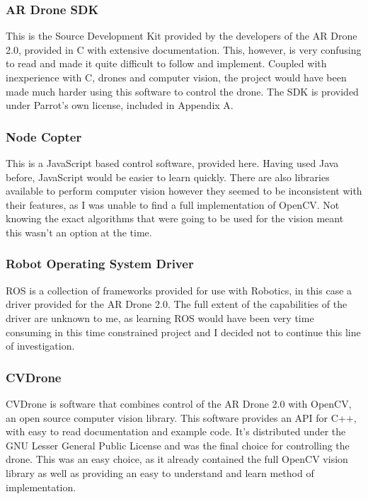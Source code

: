 \subsubsection{AR Drone SDK}
This is the Source Development Kit provided by the developers of the AR Drone 2.0\cite{DroneAPI}, provided in C with extensive documentation\cite{DroneDevGuide}. This, however, is very confusing to read and made it quite difficult to follow and implement. Coupled with inexperience with C, drones and computer vision, the project would have been made much harder using this software to control the drone. The SDK is provided under Parrot's own license, included in Appendix A.


\subsubsection{Node Copter}
This is a JavaScript based control software, provided here\cite{nodecop}. Having used Java before, JavaScript would be easier to learn quickly. There are also libraries available to perform computer vision however they seemed to be inconsistent with their features, as I was unable to find a full implementation of OpenCV. Not knowing the exact algorithms that were going to be used for the vision meant this wasn't an option at the time.


\subsubsection{Robot Operating System Driver}
ROS is a collection of frameworks provided for use with Robotics, in this case a driver provided for the AR Drone 2.0\cite{ROSDrone}. The full extent of the capabilities of the driver are unknown to me, as learning ROS would have been very time consuming in this time constrained project and I decided not to continue this line of investigation.


\subsubsection{CVDrone}

CVDrone is software that combines control of the AR Drone 2.0 with OpenCV, an open source computer vision library\cite{CVDrone}. This software provides an API for C++, with easy to read documentation and example code. It's distributed under the GNU Lesser General Public License\cite{GNULGPL} and was the final choice for controlling the drone.  This was an easy choice, as it already contained the full OpenCV vision library as well as providing an easy to understand and learn method of implementation.

